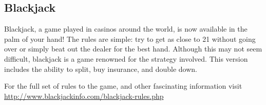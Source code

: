 \subsection{Blackjack}

Blackjack, a game played in casinos around the world, is now available
in the palm of your hand! The rules are simple: try to get as close to 21
without going over or simply beat out the dealer for the best hand.
Although this may not seem difficult, blackjack is a game renowned for the
strategy involved. This version includes the ability to split, buy insurance,
and double down. 

For the full set of rules to the game, and other fascinating information
visit\\
\url{http://www.blackjackinfo.com/blackjack-rules.php}

